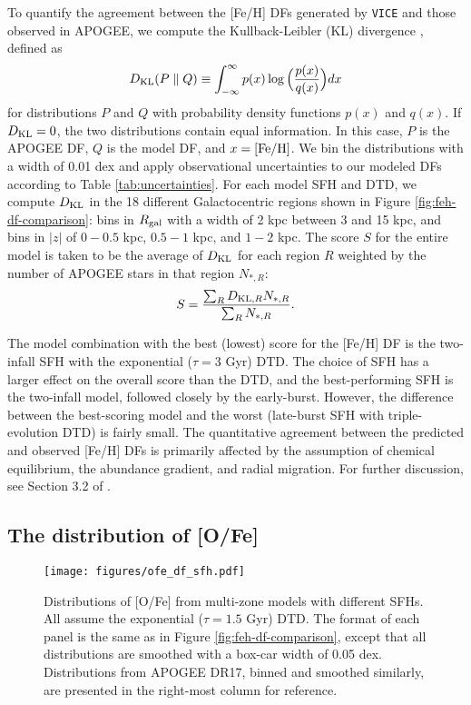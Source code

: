 \documentclass[twocolumn,twocolappendix,linenumbers,trackchanges]{aastex631}
\newcommand{\vice}{{\tt VICE}\xspace}
\begin{document}
To quantify the agreement between the [Fe/H] DFs generated by \vice and those observed in APOGEE, we compute the Kullback-Leibler (KL) divergence \citep{KullbackLeibler1951}, defined as
\begin{equation}
    D_{\rm{KL}}(P \parallel Q) \equiv \int_{-\infty}^{\infty} p(x) \log\Big(\frac{p(x)}{q(x)}\Big) dx
    \label{eq:kl-divergence}
\end{equation}
for distributions $P$ and $Q$ with probability density functions $p(x)$ and $q(x)$. If $D_{\rm KL}=0$, the two distributions contain equal information. In this case, $P$ is the APOGEE DF, $Q$ is the model DF, and $x={\rm [Fe/H]}$. We bin the distributions with a width of 0.01 dex and apply observational uncertainties to our modeled DFs according to Table \ref{tab:uncertainties}. For each model SFH and DTD, we compute $D_{\rm{KL}}$ in the 18 different Galactocentric regions shown in Figure \ref{fig:feh-df-comparison}: bins in $R_{\rm gal}$ with a width of 2 kpc between 3 and 15 kpc, and bins in $|z|$ of $0-0.5$ kpc, $0.5-1$ kpc, and $1-2$ kpc. The score $S$ for the entire model is taken to be the average of $D_{\rm{KL}}$ for each region $R$ weighted by the number of APOGEE stars in that region $N_{*,R}$:
\begin{equation}
    S = \frac{\sum_R D_{{\rm KL},R} N_{*,R}}{\sum_R N_{*,R}}.
    \label{eq:feh-df-score}
\end{equation}

The model combination with the best (lowest) score for the [Fe/H] DF is the two-infall SFH with the exponential ($\tau=3$ Gyr) DTD. The choice of SFH has a larger effect on the overall score than the DTD, and the best-performing SFH is the two-infall model, followed closely by the early-burst. However, the difference between the best-scoring model and the worst (late-burst SFH with triple-evolution DTD) is fairly small. The quantitative agreement between the predicted and observed [Fe/H] DFs is primarily affected by the assumption of chemical equilibrium, the abundance gradient, and radial migration. For further discussion, see Section 3.2 of .

\subsection{The distribution of [O/Fe]}
\label{sec:ofe-df}

\begin{figure*}
    \centering
    \texttt{[image: figures/ofe\_df\_sfh.pdf]}
    \caption{Distributions of [O/Fe] from multi-zone models with different SFHs. All assume the exponential ($\tau=1.5$ Gyr) DTD. The format of each panel is the same as in Figure \ref{fig:feh-df-comparison}, except that all distributions are smoothed with a box-car width of 0.05 dex. Distributions from APOGEE DR17, binned and smoothed similarly, are presented in the right-most column for reference.}
    \label{fig:ofe-df-sfh}
\end{figure*}
\end{document}
